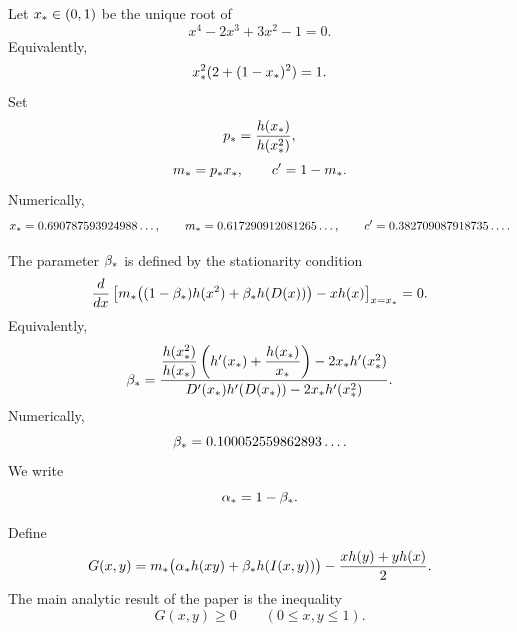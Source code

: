 Let \(x_*\in(0,1)\) be the unique root of
\begin{equation}\label{eq:xstarpoly}
  x^4-2x^3+3x^2-1=0.
\end{equation}
Equivalently,
\begin{equation}\label{eq:xstarequiv}
  x_*^2(2+(1-x_*)^2)=1.
\end{equation}
Set
\begin{equation}\label{eq:pstar}
  p_* = \frac{h(x_*)}{h(x_*^2)},
\end{equation}
\begin{equation}\label{eq:mstar}
  m_*=p_*x_*,
  \qquad
  c'=1-m_*.
\end{equation}
Numerically,
\begin{equation}\label{eq:mstar_numeric}
  x_*=0.690787593924988\ldots,
  \qquad
  m_*=0.617290912081265\ldots,
  \qquad
  c'=0.382709087918735\ldots .
\end{equation}

The parameter \(\beta_*\) is defined by the stationarity condition
\begin{equation}\label{eq:betastar_stationary}
  \frac{d}{dx}\left[
  m_*\bigl((1-\beta_*)h(x^2)+\beta_* h(D(x))\bigr)-xh(x)
  \right]_{x=x_*}=0.
\end{equation}
Equivalently,
\begin{equation}\label{eq:betastar_formula}
  \beta_*=
  \frac{
  \dfrac{h(x_*^2)}{h(x_*)}
  \left(h'(x_*)+\dfrac{h(x_*)}{x_*}\right)
  -2x_* h'(x_*^2)
  }{
  D'(x_*)h'(D(x_*))-2x_* h'(x_*^2)
  }.
\end{equation}
Numerically,
\begin{equation}\label{eq:betastar_numeric}
  \beta_*=0.100052559862893\ldots .
\end{equation}
We write
\begin{equation}\label{eq:alpha}
  \alpha_*=1-\beta_*.
\end{equation}

Define
\begin{equation}\label{eq:Gdef}
  G(x,y)=m_*\bigl(\alpha_* h(xy)+\beta_* h(I(x,y))\bigr)-\frac{x h(y)+y h(x)}2.
\end{equation}
The main analytic result of the paper is the inequality
\begin{equation}\label{eq:main_bivar}
  G(x,y)\ge 0
  \qquad(0\le x,y\le 1).
\end{equation}

